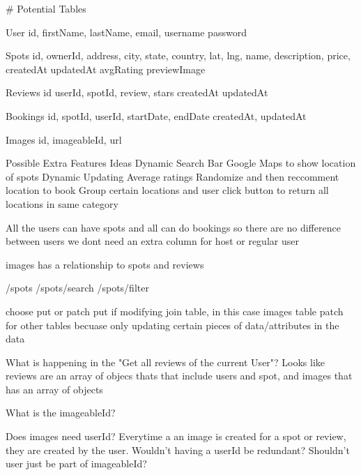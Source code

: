# Potential Tables


User
    id,
    firstName,
    lastName,
    email,
    username
    password


Spots
    id,
    ownerId,
    address,
    city,
    state,
    country,
    lat,
    lng,
    name,
    description,
    price,
    createdAt
    updatedAt
    avgRating
    previewImage

Reviews
    id
    userId,
    spotId,
    review,
    stars
    createdAt
    updatedAt

Bookings
    id,
    spotId,
    userId,
    startDate,
    endDate
    createdAt,
    updatedAt

Images
    id,
    imageableId,
    url



Possible Extra Features Ideas
    Dynamic Search Bar
    Google Maps to show location of spots
    Dynamic Updating Average ratings
    Randomize and then reccomment location to book
    Group certain locations and user click button to return all locations in same category




All the users can have spots and all can do bookings so there are no difference between users
we dont need an extra column for host or regular user





images has a relationship to spots and reviews




/spots
/spots/search
/spots/filter



choose put or patch
put if modifying join table, in this case images table
patch for other tables becuase only updating certain pieces of data/attributes in the data

What is happening in the "Get all reviews of the current User"? Looks like reviews are an array of objecs thats that include users and spot, and images that has an array of objects


What is the imageableId?

Does images need userId? Everytime a an image is created for a spot or review, they are created by the user. Wouldn't having a userId be redundant? Shouldn't user just be part of imageableId?